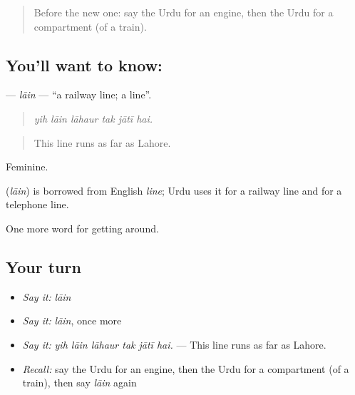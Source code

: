 \label{lesson:UR-C386-lain}



\begin{quote}
Before the new one: say the Urdu for an engine, then the Urdu for a compartment (of a train).
\end{quote}

\subsection*{You'll want to know: }
\textbf{} — \emph{lāin} — \textquotedblleft{}a railway line; a line\textquotedblright{}.

\begin{quote}
     
\end{quote}

\begin{quote}
\emph{yih lāin lāhaur tak jātī hai.}
\end{quote}

\begin{quote}
This line runs as far as Lahore.
\end{quote}

Feminine.

\begin{cousinweb}
\textbf{} (\emph{lāin}) is borrowed from English \emph{line}; Urdu uses it for a railway line and for a telephone line.
\end{cousinweb}

\begin{grammarlens}[title={What you've built}]
One more word for getting around.
\end{grammarlens}

\subsection*{Your turn}
\begin{itemize}
\raggedright
  \item \emph{Say it:} \emph{lāin}
  \item \emph{Say it:} \emph{lāin}, once more
  \item \emph{Say it:} \emph{yih lāin lāhaur tak jātī hai.} — This line runs as far as Lahore.
  \item \emph{Recall:} say the Urdu for an engine, then the Urdu for a compartment (of a train), then say \emph{lāin} again
\end{itemize}

